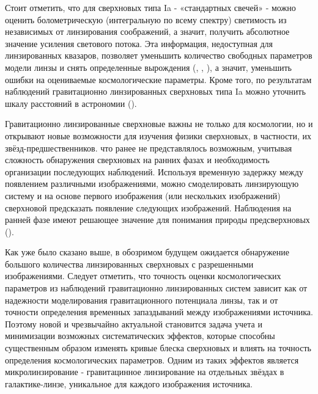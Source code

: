 Стоит отметить, что для сверхновых типа Ia - «стандартных свечей» - можно оценить болометрическую (интегральную по всему спектру) светимость из независимых от линзирования соображений, а значит, получить абсолютное значение усиления светового потока. Эта информация, недоступная для линзированных квазаров, позволяет уменьшить количество свободных параметров модели линзы и снять определенные вырождения (\cite{falco1985}, \cite{holz2001}, \cite{ogurikawano2003}), а значит, уменьшить ошибки на  оцениваемые космологические параметры. Кроме того, по результатам наблюдений гравитационно линзированных сверхновых типа Ia можно уточнить шкалу расстояний в астрономии (\cite{ddr}).

Гравитационно линзированные сверхновые важны не только для космологии, но и открывают новые возможности для изучения физики сверхновых, в частности, их звёзд-предшественников.  %
что ранее не представлялось возможным, учитывая сложность обнаружения сверхновых на ранних фазах и необходимость организации последующих наблюдений. Используя временную задержку между появлением различными изображениями, можно смоделировать линзирующую систему и на основе первого изображения (или нескольких изображений) сверхновой предсказать  появление следующих изображений. Наблюдения на ранней фазе имеют решающее значение для понимания природы предсверхновых (\cite{holismokesI}).

Как уже было сказано выше, в обозримом будущем ожидается обнаружение большого количества линзированных сверхновых с разрешенными изображениями.  Следует отметить,  что точность оценки космологических параметров из наблюдений гравитационно линзированных систем зависит как от надежности моделирования гравитационного потенциала линзы, так и от точности определения временных запаздываний между изображениями источника. Поэтому новой и чрезвычайно актуальной становится задача учета и минимизации возможных систематических эффектов, которые способны существенным образом изменять кривые блеска сверхновых и влиять на точность определения космологических параметров. Одним из таких эффектов является микролинзирование - гравитацинное линзирование на отдельных звёздах в галактике-линзе, уникальное для каждого изображения источника.  


